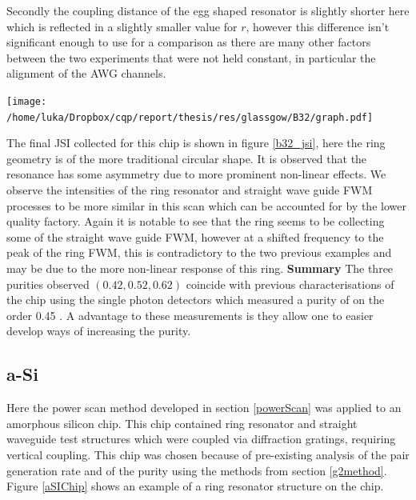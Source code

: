 Secondly the coupling distance of the egg shaped resonator is slightly shorter here which is reflected in a slightly smaller value for $r$, however this difference isn't significant enough to use for a comparison as there are many other factors between the two experiments that were not held constant, in particular the alignment of the AWG channels.

\begingroup
    \centering  
    \texttt{[image: /home/luka/Dropbox/cqp/report/thesis/res/glassgow/B32/graph.pdf]}
     \vspace{3pt} \label{b32_jsi}
\endgroup

The final JSI collected for this chip is shown in figure \ref{b32_jsi}, here the ring geometry is of the more traditional circular shape. It is observed that the resonance has some asymmetry due to more prominent non-linear effects. We observe the intensities of the ring resonator and straight wave guide FWM processes to be more similar in this scan which can be accounted for by the lower quality factory. Again it is notable to see that the ring seems to be collecting some of the straight wave guide FWM, however at a shifted frequency to the peak of the ring FWM, this is contradictory to the two previous examples and may be due to the more non-linear response of this ring.
\newline\newline
\noindent
{\bf Summary }The three purities observed $(0.42,0.52,0.62)$ coincide with previous characterisations of the chip using the single photon detectors which measured a purity of on the order 0.45 \cite{scammell_indistinguishable_2014}. A advantage to these measurements is they allow one to easier develop ways of increasing the purity.
\subsection{a-Si}


Here the power scan method developed in section \ref{powerScan} was applied to an amorphous silicon chip. This chip contained ring resonator and straight waveguide test structures which were coupled via diffraction gratings, requiring vertical coupling. This chip was chosen because of pre-existing analysis of the pair generation rate and of the purity using the methods from section \ref{g2method}. Figure \ref{aSIChip} shows an example of a ring resonator structure on the chip.

